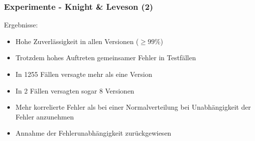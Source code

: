 %
%
\begin{frame}
	\frametitle{Experimente - Knight \& Leveson (2)}
	
	Ergebnisse:
	\begin{itemize}
		\item Hohe Zuverlässigkeit in allen Versionen ($\geq 99\%$)
		\item Trotzdem hohes Auftreten gemeinsamer Fehler in Testfällen
		\item In 1255 Fällen versagte mehr als eine Version
		\item In 2 Fällen versagten sogar 8 Versionen
		\item Mehr korrelierte Fehler als bei einer Normalverteilung bei Unabhängigkeit der Fehler anzunehmen
		\item Annahme der Fehlerunabhängigkeit zurückgewiesen
	\end{itemize}
	
\end{frame}

